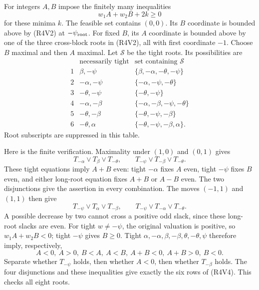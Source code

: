 For integers \(A,B\) impose the finitely many inequalities
\[
                       w_1A+w_2B+2k\ge0                  \tag{R4V3}
\]
for these minima \(k\).
The feasible set contains \((0,0)\).
Its \(B\) coordinate is bounded above by (R4V2) at
\(-\psi_{\rm root}\).
For fixed \(B\), its \(A\) coordinate is bounded above by
one of the three cross-block roots in (R4V2), all with
first coordinate \(-1\).
Choose \(B\) maximal and then \(A\) maximal.
Let \(\mathcal S\) be the tight roots. Its possibilities are
\[
\begin{array}{c|c|c}
 &\text{necessarily tight}&\text{set containing }\mathcal S\\ \hline
1&\beta,-\psi&\{\beta,-\alpha,-\theta,-\psi\}\\
2&-\alpha,-\psi&\{-\alpha,-\psi,-\theta\}\\
3&-\theta,-\psi&\{-\theta,-\psi\}\\
4&-\alpha,-\beta&\{-\alpha,-\beta,-\psi,-\theta\}\\
5&-\theta,-\beta&\{-\theta,-\psi,-\beta\}\\
6&-\theta,\alpha&\{-\theta,-\psi,-\beta,\alpha\}.
\end{array}                                               \tag{R4V4}
\]
Root subscripts are suppressed in this table.

Here is the finite verification.
Maximality under \((1,0)\) and \((0,1)\) gives
\[
 T_{-\alpha}\vee T_\beta\vee T_{-\theta},\qquad
 T_{-\psi}\vee T_{-\beta}\vee T_{-\theta}.
\]
These tight equations imply \(A+B\) even: tight \(-\alpha\)
fixes \(A\) even, tight \(-\psi\) fixes \(B\) even,
and either long-root equation fixes \(A+B\) or \(A-B\) even.
The two disjunctions give the assertion in every combination.
The moves \((-1,1)\) and \((1,1)\) then give
\[
 T_{-\psi}\vee T_\alpha\vee T_{-\beta},\qquad
 T_{-\psi}\vee T_{-\alpha}\vee T_{-\theta}.
\]
A possible decrease by two cannot cross a positive odd slack,
since these long-root slacks are even.
For tight \(w\ne-\psi\), the original valuation is positive,
so \(w_1A+w_2B<0\); tight \(-\psi\) gives \(B\ge0\).
Tight \(\alpha,-\alpha,\beta,-\beta,\theta,-\theta,\psi\)
therefore imply, respectively,
\[
 A<0,\ A>0,\ B<A,\ A<B,\ A+B<0,\ A+B>0,\ B<0.
\]
Separate whether \(T_{-\psi}\) holds, then whether \(A<0\),
then whether \(T_{-\beta}\) holds. The four disjunctions and
these inequalities give exactly the six rows of (R4V4).
This checks all eight roots.

